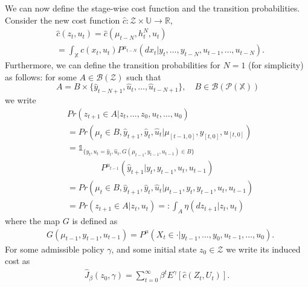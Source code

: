 \documentclass[letterpaper, 10 pt, conference]{ieeeconf}  %
\def\B{{\mathcal B}}
\def\P{{\mathcal P}}
\theoremstyle{definition}
\theoremstyle{remark}
\begin{document}
We can now define the stage-wise cost function and the transition probabilities. Consider the new cost function $\hat{c}:{\mathcal{Z}}\times \mathds{U}\to \mathds{R}$,  
\begin{align}\label{hat_cost}
&\hat{c}({z}_t,u_t)=\hat{c}(\mu_{t-N},h_t^N,u_t)\\%
&=\int_\mathds{X}c(x_t,u_t)P^{\mu_{t-N}}(dx_t|y_t,\dots,y_{t-N},u_{t-1},\dots,u_{t-N}).\nonumber
\end{align}
Furthermore, we can define the transition probabilities for $N=1$ (for simplicity) as follows: for some $A\in \B(\mathcal{Z})$ such that 
\[\ A= B\times\{\hat{y}_{t-N+1},\hat{u}_{t},\dots,\hat{u}_{t-N+1}\},\quad  B\in\B(\P(\mathds{X})) \]
we write
\begin{align*}
&Pr({z}_{t+1}\in A|{z}_{t},\dots,{z}_0,u_{t},\dots,u_0) \\
&=Pr(\mu_t\in B,\hat{y}_{t+1},\hat{y}_{t},\hat{u}_{t}|\mu_{[t-1,0]},y_{[t,0]},u_{[t,0]})\\
&=\mathds{1}_{\{y_{t},u_{t}=\hat{y}_{t},\hat{u}_{t},G(\mu_{t-1},y_{t-1},u_{t-1})\in B\}}\\
&\qquad\qquad P^{\mu_{t-1}}(\hat{y}_{t+1}|y_t,y_{t-1},u_{t},u_{t-1})\\
&=Pr(\mu_{t}\in B,\hat{y}_{t+1},\hat{y}_{t},\hat{u}_{t}|\mu_{t-1},y_t,y_{t-1},u_t,u_{t-1})\\
&=Pr({z}_{t+1}\in A|{z}_t,u_t)=:\int_A{\eta}(d{z}_{t+1}|{z}_t,u_t)
\end{align*}
where the map $G$ is defined as 
\begin{align*}
&G(\mu_{t-1},y_{t-1},u_{t-1})=P^\mu(X_{t}\in\cdot|y_{t-1},\dots,y_0,u_{t-1},\dots,u_0).
\end{align*}
For some admissible policy $\gamma$, and some initial state $z_0\in\mathcal{Z}$ we write its induced cost as 
\begin{align*}
\hat{J}_\beta(z_0,\gamma) = \sum_{t=0}^\infty \beta^t E^\gamma[\hat{c}(Z_t,U_t)].
\end{align*}
\end{document}
